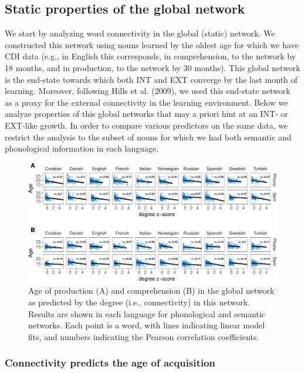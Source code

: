 \documentclass[english,floatsintext,man]{apa6}
\theoremstyle{definition}
\theoremstyle{definition}
\theoremstyle{definition}
\theoremstyle{remark}
\begin{document}
\subsection{Static properties of the global
network}\label{static-properties-of-the-global-network}

We start by analyzing word connectivity in the global (static) network.
We constructed this network using nouns learned by the oldest age for
which we have CDI data (e.g., in English this corresponds, in
comprehension, to the network by 18 months, and in production, to the
network by 30 months). This global network is the end-state towards
which both INT and EXT converge by the last month of learning. Moreover,
following Hills et al. (2009), we used this end-state network as a proxy
for the external connectivity in the learning environment. Below we
analyze properties of this global networks that may a priori hint at an
INT- or EXT-like growth. In order to compare various predictors on the
same data, we restrict the analysis to the subset of nouns for which we
had both semantic and phonological information in each language.

\begin{figure}[!h]
\includegraphics[width=\textwidth]{ms_files/figure-latex/corrAll-1} \caption{Age of production (A) and comprehension (B) in the global network as predicted by the degree (i.e., connectivity) in this network. Results are shown in each language for phonological and semantic networks. Each point is a word, with lines indicating linear model fits, and numbers indicating the Pearson correlation coefficients.}\label{fig:corrAll}
\end{figure}

\subsubsection{Connectivity predicts the age of
acquisition}\label{connectivity-predicts-the-age-of-acquisition}
\end{document}
